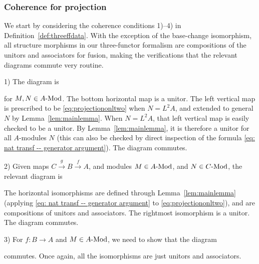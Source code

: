 \documentclass[10pt,a4paper,oneside]{amsart}
\theoremstyle{remark}
\theoremstyle{definition}
\newcommand{\lmod}[1]{#1\textnormal{-Mod}}
\newcommand{\rar}{\rightarrow}
\newcommand{\cofu}[1]{\mathop{\boxtimes}_{#1}}
\newcommand{\vn}[1]{{#1}}
\begin{document}
\subsubsection{Coherence for projection} 
We start by considering the coherence conditions 1)--4) in Definition~\ref{def:threeffdata}. With the exception of the base-change isomorphism, all structure morphisms in our three-functor formalism are compositions of the unitors and associators for fusion, making the verifications that the relevant diagrams commute very routine.

1) The diagram is
\begin{center}
\end{center}
for $M,N\in \lmod{A}$.
The bottom horizontal map is a unitor.
The left vertical map is prescribed to be \eqref{eq:projectiononltwo} when $N=L^2A$, and extended to general $N$ by Lemma~\ref{lem:mainlemma}.
When $N=L^2A$, that left vertical map is easily checked to be a unitor.
By Lemma~\ref{lem:mainlemma}, it is therefore a unitor for all $A$-modules $N$ (this can also be checked by direct inspection of the formula \eqref{eq: nat transf -- generator argument}).
The diagram commutes.

2) Given maps $C\stackrel{g}\to B\stackrel{f}\to A$, and modules $M\in\lmod{A}$, and $N\in\lmod{C}$, the relevant diagram is
\begin{center}
\end{center}
The horizontal isomorphisms are defined through Lemma~\ref{lem:mainlemma} (applying \eqref{eq: nat transf -- generator argument} to \eqref{eq:projectiononltwo}), and are compositions of unitors and associators. 
The rightmost isomorphism is a unitor.
The diagram commutes.

3) For $\vn{f}\colon B\rar A$ and $M\in \lmod{A}$, we need to show that the diagram
\begin{center}
\end{center}
commutes.
Once again, all the isomorphisms are just unitors and associators.
\end{document}
